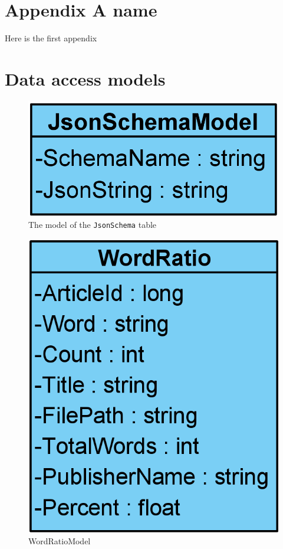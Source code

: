 \chapter{Appendix A name}\label{ch:appAlabel}
Here is the first appendix

\chapter{Data access models}\label{AppDataAccess}
\begin{figure}[H]
    \centering
    \includegraphics[scale=0.25]{Images/JsonSchemaModel.png}
    \caption{The model of the \texttt{JsonSchema} table}
    \label{JsonSchemaModel}
\end{figure}
\begin{figure}[H]
    \centering
    \includegraphics[scale=0.25]{Images/WordRatioModel.png}
    \caption{WordRatioModel}
    \label{WordRatioModel}
\end{figure}
